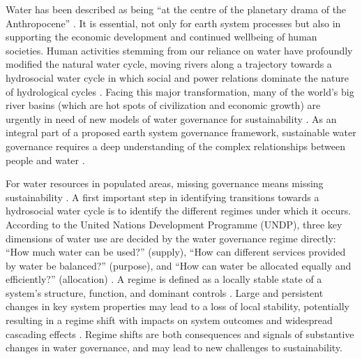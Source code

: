 \label{Intro.}
Water has been described as being ``at the centre of the planetary drama of the Anthropocene'' 
\cite{gleesonIlluminatingwatercycle2020}. 
It is essential, not only for earth system processes but also in supporting the economic development and continued wellbeing of human societies. Human activities stemming from our reliance on water have profoundly modified the natural water cycle, moving rivers along a trajectory towards a hydrosocial water cycle in which social and power relations dominate the nature of hydrological cycles 
\cite{gleesonIlluminatingwatercycle2020,sivapalanSociohydrologynewscience2012,qinTheoreticalframeworkdualistic2014,abbottwatercycleAnthropocene2019,leviaHomogenizationterrestrialwater2020}. 
Facing this major transformation, many of the world’s big river basins (which are hot spots of civilization and economic growth) are urgently in need of new models of water governance for sustainability 
\cite{bestAnthropogenicstressesworld2019,falkenmarkUnderstandingwaterresilience2019,dibaldassarreSociohydrologyScientificChallenges2019}. 
As an integral part of a proposed earth system governance framework, sustainable water governance requires a deep understanding of the complex relationships between people and water
\cite{dibaldassarreSociohydrologyScientificChallenges2019,biermannNavigatingAnthropoceneImproving2012,steffenemergenceevolutionEarth2020}. 

For water resources in populated areas, missing governance means missing sustainability 
\cite{undpwatergovernancefacilityWaterGovernanceIssue}. 
A first important step in identifying transitions towards a hydrosocial water cycle is to identify the different regimes under which it occurs. 
According to the United Nations Development Programme (UNDP), three key dimensions of water use are decided by the water governance regime directly: ``How much water can be used?'' (supply), ``How can different services provided by water be balanced?'' (purpose), and ``How can water be allocated equally and efficiently?'' (allocation)
\cite{undpwatergovernancefacilityWaterGovernanceIssue, mariajacobsonUserguideassessing2013, kjellenWatergovernanceperspective2015}. 
A regime is defined as a locally stable state of a system’s structure, function, and dominant controls 
\cite{carpenterEarlyWarningsRegime2011}. 
Large and persistent changes in key system properties may lead to a loss of local stability, potentially resulting in a regime shift with impacts on system outcomes and widespread cascading effects 
\cite{rochaCascadingregimeshifts2018, gregrCascadingsocialecologicalcosts2020}. 
Regime shifts are both consequences and signals of substantive changes in water governance, and may lead to new challenges to sustainability. 

